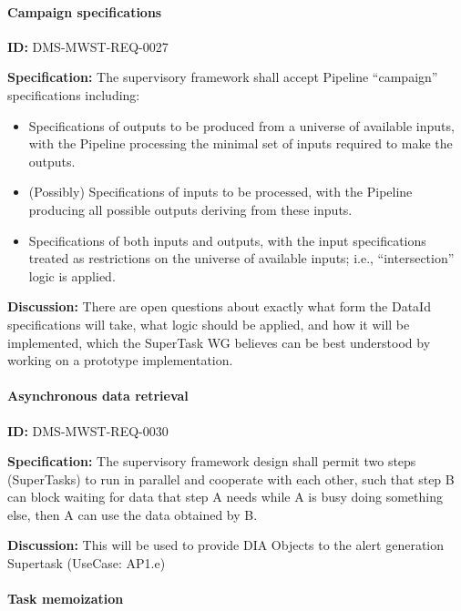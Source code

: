 \documentclass[SE,toc,lsstdraft]{lsstdoc}
\begin{document}
\paragraph{Campaign specifications}\hfill  %

\label{DMS-MWST-REQ-0027}
\textbf{ID:} DMS-MWST-REQ-0027

\textbf{Specification:}
The supervisory framework shall accept Pipeline “campaign” specifications including:

    \begin{itemize}
\item
Specifications of outputs to be produced from a universe of available inputs, with the Pipeline processing the minimal set of inputs required to make the outputs.

\item
(Possibly) Specifications of inputs to be processed, with the Pipeline producing all possible outputs deriving from these inputs.

\item
Specifications of both inputs and outputs, with the input specifications treated as restrictions on the universe of available inputs; i.e., “intersection” logic is applied.

    \end{itemize}

\textbf{Discussion:}
There are open questions about exactly what form the DataId specifications will take, what logic should be applied, and how it will be implemented, which the SuperTask WG believes can be best understood by working on a prototype implementation.

\paragraph{Asynchronous data retrieval}\hfill  %

\label{DMS-MWST-REQ-0030}
\textbf{ID:} DMS-MWST-REQ-0030

\textbf{Specification:}
The supervisory framework design shall permit two steps (SuperTasks) to run in parallel and cooperate with each other, such that step B can block waiting for data that step A needs while A is busy doing something else, then A can use the data obtained by B.

\textbf{Discussion:}
This will be used to provide DIA Objects to the alert generation Supertask (UseCase: AP1.e)

\paragraph{Task memoization}\hfill  %
\end{document}
